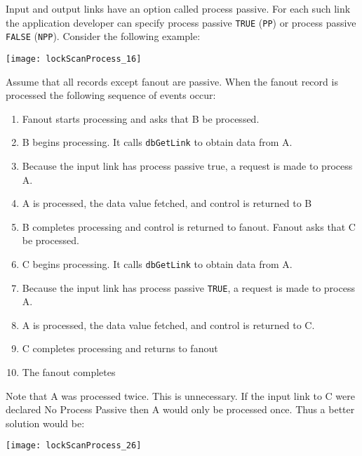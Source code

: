 Input and output links have an option called process passive.
For each such link the application developer can specify process passive \verb|TRUE| (\verb|PP|) or process passive \verb|FALSE| (\verb|NPP|).
Consider the following example:

\begin{center}
\texttt{[image: lockScanProcess\_16]}
\end{center}

Assume that all records except fanout are passive.
When the fanout record is processed the following sequence of events occur:

\begin{enumerate}
\item Fanout starts processing and asks that B be processed.

\item B begins processing.
It calls \verb|dbGetLink| to obtain data from A.

\item Because the input link has process passive true, a request is made to process A.

\item A is processed, the data value fetched, and control is returned to B

\item B completes processing and control is returned to fanout.
Fanout asks that C be processed.

\item C begins processing.
It calls \verb|dbGetLink| to obtain data from A.

\item Because the input link has process passive \verb|TRUE|, a request is made to process A.

\item A is processed, the data value fetched, and control is returned to C.

\item C completes processing and returns to fanout

\item The fanout completes

\end{enumerate}

Note that A was processed twice.
This is unnecessary.
If the input link to C were declared No Process Passive then A would only be processed once.
Thus a better solution would be:

\begin{center}
\texttt{[image: lockScanProcess\_26]}
\end{center}

